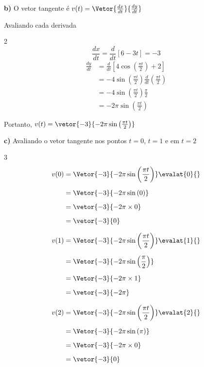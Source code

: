 \documentclass[a4paper,12pt,fleqn]{article}
\begin{document}
\begin{answer}
  \vspace{-\baselineskip}
  \textbf{b)} \quad
  O vetor tangente é
  \(
  v(t) = \Vetor{\frac{dx}{dt}}{\frac{dy}{dt}}
  \)

  Avaliando cada derivada
  \begin{multicols}{2}
    \[
      \frac{dx}{dt}
      = \frac{d}{dt}\left[6 - 3t\right]
      = -3
    \]
    \newcolumn
    \begin{align*}
      \frac{dy}{dt}
      & = \frac{d}{dt}\left[4\cos\left(\frac{\pi t}{2}\right) + 2\right] \\
      & = -4\sin\left(\frac{\pi t}{2}\right)\frac{d}{dt}\left(\frac{\pi t}{2}\right) \\
      & = -4\sin\left(\frac{\pi t}{2}\right)\frac{\pi}{2} \\
      & = -2\pi\sin\left(\frac{\pi t}{2}\right)
    \end{align*}
  \end{multicols}
  \vspace{-\baselineskip}
  Portanto,
  \(
    v(t) = \vetor{-3}{-2\pi\sin\left(\frac{\pi t}{2}\right)}
  \)

  \bigskip
  \textbf{c)} \quad
  Avaliando o vetor tangente nos pontos $t=0$, $t=1$ e em $t=2$
  \begin{multicols}{3}
    \setlength{\mathindent}{0pt}
    \begin{align*}
      v(0)
      & = \Vetor{-3}{-2\pi\sin\left(\frac{\pi t}{2}\right)} \evalat{0}{} \\[2mm]
      & = \Vetor{-3}{-2\pi\sin\left(0\right)} \\[2mm]
      & = \vetor{-3}{-2\pi\times 0} \\[2mm]
      & = \vetor{-3}{0}
    \end{align*}

    \newcolumn
    \begin{align*}
      v(1)
      & = \Vetor{-3}{-2\pi\sin\left(\frac{\pi t}{2}\right)} \evalat{1}{} \\[2mm]
      & = \Vetor{-3}{-2\pi\sin\left(\frac{\pi}{2}\right)} \\[2mm]
      & = \Vetor{-3}{-2\pi\times 1} \\[2mm]
      & = \vetor{-3}{-2\pi}
    \end{align*}

    \newcolumn
    \begin{align*}
      v(2)
      & = \Vetor{-3}{-2\pi\sin\left(\frac{\pi t}{2}\right)} \evalat{2}{} \\[2mm]
      & = \Vetor{-3}{-2\pi\sin\left(\pi\right)} \\[2mm]
      & = \Vetor{-3}{-2\pi\times 0} \\[2mm]
      & = \vetor{-3}{0}
    \end{align*}
  \end{multicols}
\end{answer}
\end{document}

